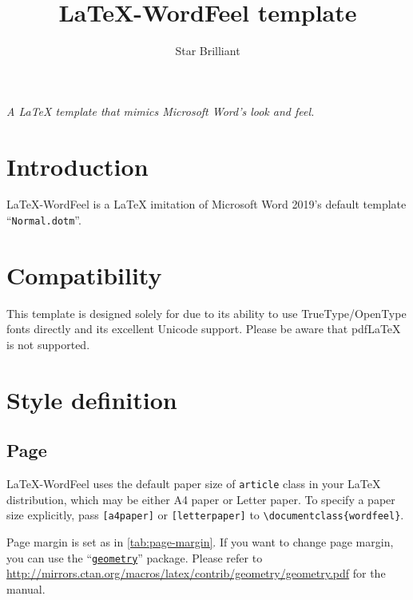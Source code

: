 \documentclass[letterpaper]{wordfeel}
\title{\LaTeX-WordFeel template}
\author{Star Brilliant}
\begin{document}

\begin{titlepage}

\maketitle

{\Large\textit{A \LaTeX{} template that mimics Microsoft Word's look and feel.}}

\tableofcontents

\end{titlepage}

\clearpage
{}
\section{Introduction}

\LaTeX-WordFeel is a \LaTeX{} imitation of Microsoft Word 2019's default template ``\texttt{Normal.dotm}''.

\section{Compatibility}

This template is designed solely for \XeLaTeX{} due to its ability to use TrueType/OpenType fonts directly and its excellent Unicode support. Please be aware that pdf\LaTeX{} is not supported.

\section{Style definition}

\subsection{Page}

\FloatBarrier

\LaTeX-WordFeel uses the default paper size of \texttt{article} class in your \LaTeX{} distribution, which may be either A4 paper or Letter paper. To specify a paper size explicitly, pass \texttt{[a4paper]} or \texttt{[letterpaper]} to \texttt{\textbackslash{}documentclass\{wordfeel\}}.

Page margin is set as in \autoref{tab:page-margin}. If you want to change page margin, you can use the ``\href{https://ctan.org/pkg/geometry}{\texttt{geometry}}'' package. Please refer to \url{http://mirrors.ctan.org/macros/latex/contrib/geometry/geometry.pdf} for the manual.
\end{document}
